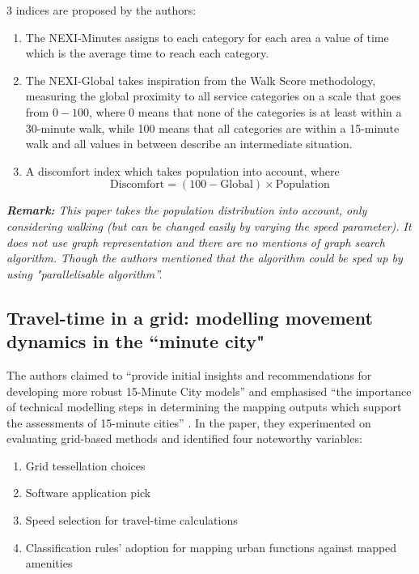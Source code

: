 3 indices are proposed by the authors:

\begin{enumerate}
\item The NEXI-Minutes assigns to each category for each area a value of time which is the average time to reach each category.
\item The NEXI-Global takes inspiration from the Walk Score methodology, measuring the global proximity to all service categories on a scale that goes from $0 - 100$, where 0 means that none of the categories is at least within a 30-minute walk, while 100 means that all categories are within a 15-minute walk and all values in between describe an intermediate situation.
\item A discomfort index which takes population into account, where
$$\text{Discomfort} = (100-\text{Global})\times\text{Population}$$
\end{enumerate}

\textit{\textbf{Remark:} This paper takes the population distribution into account, only considering walking (but can be changed easily by varying the speed parameter). It does not use graph representation and there are no mentions of graph search algorithm. Though the authors mentioned that the algorithm could be sped up by using  "parallelisable algorithm”.}

\subsection{Travel-time in a grid: modelling movement dynamics in the ``minute city"}

The authors claimed to “provide initial insights and recommendations for developing more robust 15-Minute City models” and emphasised “the importance of technical modelling steps in determining the mapping outputs which support the assessments of 15-minute cities” \cite{Pezzica_Altafini_Mara_Chioni_2024}. In the paper, they experimented on evaluating grid-based methods and identified four noteworthy variables: 

\begin{enumerate}
    \item Grid tessellation choices
    \item Software application pick
    \item Speed selection for travel-time calculations
    \item Classification rules' adoption for mapping urban functions against mapped amenities
\end{enumerate}

